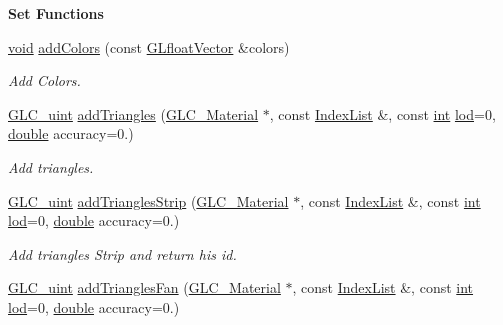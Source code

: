 \begin{Indent}{\bf Set Functions}
\begin{DoxyCompactItemize}
\hyperlink{group___u_a_v_objects_plugin_ga444cf2ff3f0ecbe028adce838d373f5c}{void} \hyperlink{class_g_l_c___mesh_ad7a0ee9982d5f6cb3a238241d3eb97a1}{add\-Colors} (const \hyperlink{glc__global_8h_a9f3f0b00cd127b066c9931b9c257a046}{G\-Lfloat\-Vector} \&colors)
\begin{DoxyCompactList}\small\item\em Add Colors. \end{DoxyCompactList}\item 
\hyperlink{glc__global_8h_abf950976fabed69026558df8e2da6c6b}{G\-L\-C\-\_\-uint} \hyperlink{class_g_l_c___mesh_a26419d680f57123b841b94d629e9475e}{add\-Triangles} (\hyperlink{class_g_l_c___material}{G\-L\-C\-\_\-\-Material} $\ast$, const \hyperlink{glc__global_8h_a92568854751d0cfbc27eae9c76aab7cf}{Index\-List} \&, const \hyperlink{ioapi_8h_a787fa3cf048117ba7123753c1e74fcd6}{int} \hyperlink{glext_8h_a5b5a34b88a28ab9c203c2b432f6168b6}{lod}=0, \hyperlink{_super_l_u_support_8h_a8956b2b9f49bf918deed98379d159ca7}{double} accuracy=0.)
\begin{DoxyCompactList}\small\item\em Add triangles. \end{DoxyCompactList}\item 
\hyperlink{glc__global_8h_abf950976fabed69026558df8e2da6c6b}{G\-L\-C\-\_\-uint} \hyperlink{class_g_l_c___mesh_ae4b1b6c05bb1cf116363a8f0a13f9498}{add\-Triangles\-Strip} (\hyperlink{class_g_l_c___material}{G\-L\-C\-\_\-\-Material} $\ast$, const \hyperlink{glc__global_8h_a92568854751d0cfbc27eae9c76aab7cf}{Index\-List} \&, const \hyperlink{ioapi_8h_a787fa3cf048117ba7123753c1e74fcd6}{int} \hyperlink{glext_8h_a5b5a34b88a28ab9c203c2b432f6168b6}{lod}=0, \hyperlink{_super_l_u_support_8h_a8956b2b9f49bf918deed98379d159ca7}{double} accuracy=0.)
\begin{DoxyCompactList}\small\item\em Add triangles Strip and return his id. \end{DoxyCompactList}\item 
\hyperlink{glc__global_8h_abf950976fabed69026558df8e2da6c6b}{G\-L\-C\-\_\-uint} \hyperlink{class_g_l_c___mesh_a9fb5ca72e9e78e821e248d8695a7e7fc}{add\-Triangles\-Fan} (\hyperlink{class_g_l_c___material}{G\-L\-C\-\_\-\-Material} $\ast$, const \hyperlink{glc__global_8h_a92568854751d0cfbc27eae9c76aab7cf}{Index\-List} \&, const \hyperlink{ioapi_8h_a787fa3cf048117ba7123753c1e74fcd6}{int} \hyperlink{glext_8h_a5b5a34b88a28ab9c203c2b432f6168b6}{lod}=0, \hyperlink{_super_l_u_support_8h_a8956b2b9f49bf918deed98379d159ca7}{double} accuracy=0.)

\end{DoxyCompactItemize}
\end{Indent}
